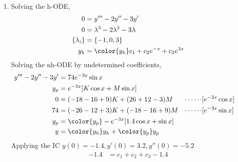 \begin{enumerate}
\begin{figure}[H]
          \end{figure}

    \item Solving the h-ODE,
          \begin{align}
              0               & = y''' - 2y'' - 3y'                         \\
              0               & = \lambda^{3} - 2\lambda^{2} - 3\lambda     \\
              \{\lambda_{i}\} & = \{-1, 0, 3\}                              \\
              y_{h}           & = \color{y_h} c_1 + c_2 e^{-x} + c_3 e^{3x}
          \end{align}
          Solving the nh-ODE by undetermined coefficients,
          \begin{align}
              y''' - 2y'' - 3y' & = 74e^{-3x}\sin x                                                            \\
              y_{p}             & = e^{-3x}[K\cos x + M\sin x]                                                 \\
              0                 & = (-18 - 16 + 9)K + (26 + 12 - 3)M          & \cdots\cdots & [e^{-3x}\cos x] \\
              74                & = (-26 - 12 + 3)K + (-18 - 16 + 9)M         & \cdots\cdots & [e^{-3x}\sin x] \\
              y_{p}             & = \color{y_p} -e^{-3x}[1.4\cos x + \sin x]                                   \\
              y                 & = {\color{y_h} y_{h}} + {\color{y_p} y_{p}}
          \end{align}
          Applying the IC $ y(0) = -1.4, y'(0) = 3.2, y''(0) = -5.2 $
          \begin{align}
              -1.4 & = c_1 + c_2 + c_3 - 1.4                                        \\

\end{align}
\end{enumerate}
